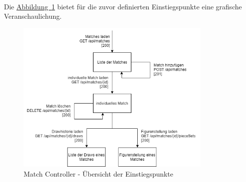 \\
Die \hyperref[fig:matchController]{Abbildung~\ref{fig:matchController}} bietet für die zuvor definierten Einstiegspunkte eine grafische Veranschaulichung.\\
\begin{figure}[htb]
	\includegraphics[width=0.85\textwidth]{images/match-controller.png}
	\caption{Match Controller - Übersicht der Einstiegspunkte}
	\label{fig:matchController}
\end{figure}


